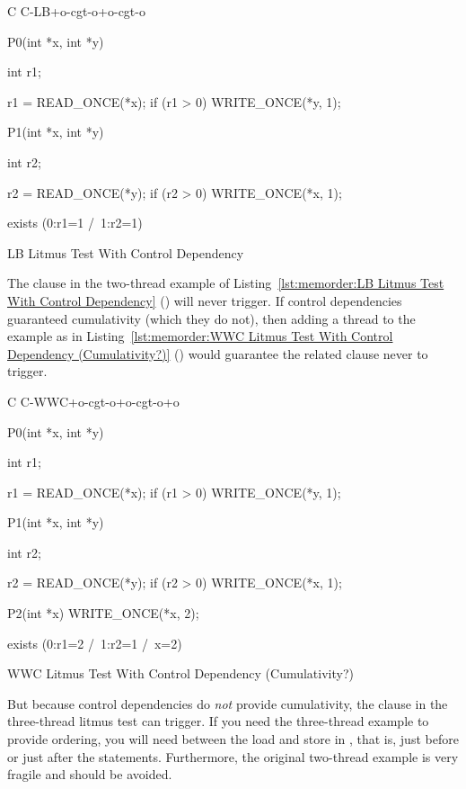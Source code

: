 \begin{listing}[tb]
{ \scriptsize
\begin{verbbox}[\LstLineNo]
C C-LB+o-cgt-o+o-cgt-o
{
}

P0(int *x, int *y)
{
  int r1;

  r1 = READ_ONCE(*x);
  if (r1 > 0)
    WRITE_ONCE(*y, 1);
}

P1(int *x, int *y)
{
  int r2;

  r2 = READ_ONCE(*y);
  if (r2 > 0)
    WRITE_ONCE(*x, 1);
}

exists (0:r1=1 /\ 1:r2=1)
\end{verbbox}
}
\centering
\theverbbox
\caption{LB Litmus Test With Control Dependency}
\label{lst:memorder:LB Litmus Test With Control Dependency}
\end{listing}

The  clause in the two-thread example of
Listing~\ref{lst:memorder:LB Litmus Test With Control Dependency}
()
will never trigger.
If control dependencies guaranteed cumulativity (which they do
not), then adding a thread to the example as in
Listing~\ref{lst:memorder:WWC Litmus Test With Control Dependency (Cumulativity?)}
()
would guarantee the related  clause never to trigger.

\begin{listing}
{ \scriptsize
\begin{verbbox}[\LstLineNo]
C C-WWC+o-cgt-o+o-cgt-o+o
{
}

P0(int *x, int *y)
{
  int r1;

  r1 = READ_ONCE(*x);
  if (r1 > 0)
    WRITE_ONCE(*y, 1);
}

P1(int *x, int *y)
{
  int r2;

  r2 = READ_ONCE(*y);
  if (r2 > 0)
    WRITE_ONCE(*x, 1);
}

P2(int *x)
{
  WRITE_ONCE(*x, 2);
}

exists (0:r1=2 /\ 1:r2=1 /\ x=2)
\end{verbbox}
}
\centering
\theverbbox
\caption{WWC Litmus Test With Control Dependency (Cumulativity?)}
\label{lst:memorder:WWC Litmus Test With Control Dependency (Cumulativity?)}
\end{listing}

But because control dependencies do \emph{not} provide cumulativity, the
 clause in the three-thread litmus test can trigger.
If you need the three-thread example to provide ordering, you will need
 between the load and store in ,
that is, just before or just after the  statements.
Furthermore, the original two-thread example is very fragile and should be avoided.

